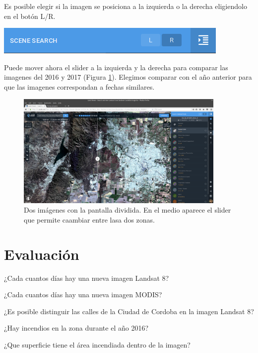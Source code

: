 \documentclass[a4paper,12pt]{book}
\begin{document}
Es posible elegir si la imagen se posiciona a la izquierda o la derecha eligiendolo en el botón L/R.

\begin{center}\includegraphics[scale=0.4]{in:LorR.png}\end{center}

Puede mover ahora el slider a la izquierda y la derecha para comparar las imagenes del 2016 y 2017 (Figura \ref{fig:slider}). Elegimos comparar con el año anterior para que las imagenes correspondan a fechas similares.

\begin{figure}[h!]
    \centering
    \includegraphics[width=0.9\textwidth]{fig:slider.png}
    \caption{Dos imágenes con la pantalla dividida. En el medio aparece el slider que permite caambiar entre lasa dos zonas.}
    \label{fig:slider}
\end{figure}

\section{Evaluación}
\begin{que}
    ¿Cada cuantos días hay una nueva imagen Landsat 8?
\end{que}
\begin{que}
    ¿Cada cuantos días hay una nueva imagen MODIS?
\end{que}
\begin{que}
    ¿Es posible distinguir las calles de la Ciudad de Cordoba en la imagen Landsat 8?
\end{que}
\begin{que}
    ¿Hay incendios en la zona durante el año 2016?
\end{que}
\begin{que}
    ¿Que superficie tiene el área incendiada dentro de la imagen?
\end{que}
\end{document}
